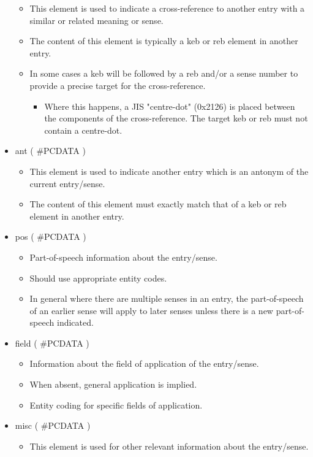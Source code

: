 \documentclass[11pt]{article}
\begin{document}
\begin{itemize}
\begin{itemize}
\item This element is used to indicate a cross-reference to another entry with a similar or related meaning or sense.
\item The content of this element is typically a keb or reb element in another entry.
\item In some cases a keb will be followed by a reb and/or a sense number to provide a precise target for the cross-reference.
\begin{itemize}
\item Where this happens, a JIS "centre-dot" (0x2126) is placed between the components of the cross-reference. The target keb or reb must not contain a centre-dot.
\end{itemize}
\end{itemize}
\item ant ( \#PCDATA )
\begin{itemize}
\item This element is used to indicate another entry which is an antonym of the current entry/sense.
\item The content of this element must exactly match that of a keb or reb element in another entry.
\end{itemize}
\item pos ( \#PCDATA )
\begin{itemize}
\item Part-of-speech information about the entry/sense.
\item Should use appropriate entity codes.
\item In general where there are multiple senses in an entry, the part-of-speech of an earlier sense will apply to later senses unless there is a new part-of-speech indicated.
\end{itemize}
\item field ( \#PCDATA )
\begin{itemize}
\item Information about the field of application of the entry/sense.
\item When absent, general application is implied.
\item Entity coding for specific fields of application.
\end{itemize}
\item misc ( \#PCDATA )
\begin{itemize}
\item This element is used for other relevant information about the entry/sense.

\end{itemize}
\end{itemize}
\end{document}
